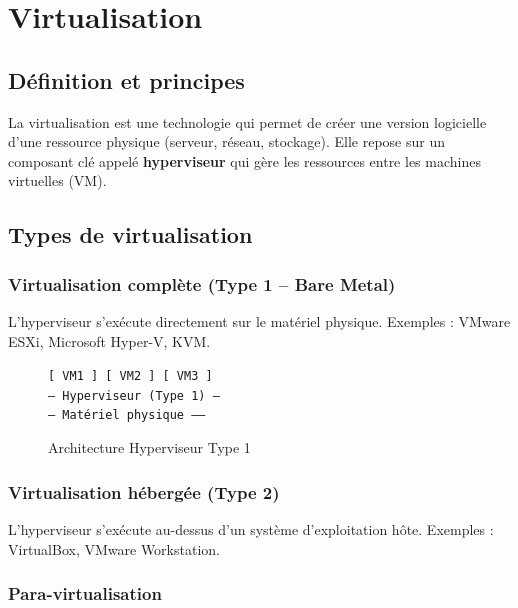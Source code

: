 \documentclass[12pt,a4paper]{article}
\begin{document}
\section{Virtualisation}

\subsection{Définition et principes}

La virtualisation est une technologie qui permet de créer une version logicielle d'une ressource physique (serveur, réseau, stockage). Elle repose sur un composant clé appelé \textbf{hyperviseur} qui gère les ressources entre les machines virtuelles (VM).

\subsection{Types de virtualisation}

\subsubsection{Virtualisation complète (Type 1 -- Bare Metal)}

L'hyperviseur s'exécute directement sur le matériel physique. Exemples : VMware ESXi, Microsoft Hyper-V, KVM.

\begin{figure}[H]
\centering
\begin{tcolorbox}[colback=gray!10,colframe=gray,width=0.7\textwidth]
\centering
\texttt{[ VM1 ] [ VM2 ] [ VM3 ]}\\
\texttt{--- Hyperviseur (Type 1) ---}\\
\texttt{--- Matériel physique ------}
\end{tcolorbox}
\caption{Architecture Hyperviseur Type 1}
\end{figure}

\subsubsection{Virtualisation hébergée (Type 2)}

L'hyperviseur s'exécute au-dessus d'un système d'exploitation hôte. Exemples : VirtualBox, VMware Workstation.

\subsubsection{Para-virtualisation}
\end{document}

